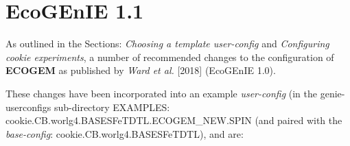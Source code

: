 \newpage


\section{EcoGEnIE 1.1}

As outlined in the Sections: \textit{Choosing a template user-config} and \textit{Configuring cookie experiments}, a number of recommended changes to the configuration of \textbf{ECOGEM} as published by \textit{Ward et al.} [2018] (EcoGEnIE 1.0).

\vspace{1mm}
These changes have been incorporated into an example \textit{user-config} (in the \textsf{\footnotesize genie-userconfigs } sub-directory \textsf{\footnotesize EXAMPLES}: \textsf{\footnotesize cookie.CB.worlg4.BASESFeTDTL.ECOGEM\_NEW.SPIN} (and paired with the \textit{base-config}: \textsf{\footnotesize cookie.CB.worlg4.BASESFeTDTL}), and are:

